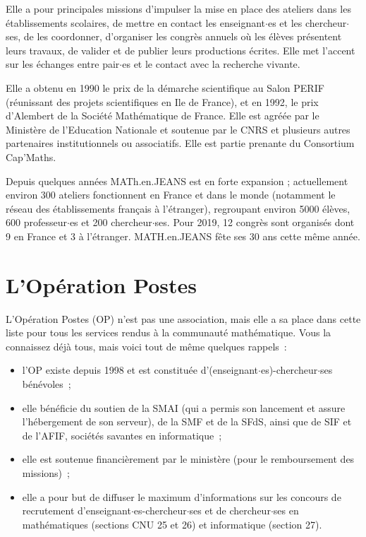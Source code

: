 Elle a pour principales missions d'impulser la mise en place des ateliers dans les \'etablissements scolaires, de mettre en contact les enseignant$\cdot$es et les chercheur$\cdot$ses, de les coordonner, d'organiser les congr\`es annuels o\`u les \'el\`eves pr\'esentent leurs travaux, de valider et de publier leurs productions \'ecrites. Elle met l'accent sur les \'echanges entre pair$\cdot$es et le contact avec la recherche vivante.

Elle a obtenu en 1990 le prix de la d\'emarche scientifique au Salon PERIF (r\'eunissant des projets scientifiques en Ile de France), et en 1992, le prix d'Alembert de la Soci\'et\'e Math\'ematique de France. Elle est agr\'e\'ee par le Minist\`ere de l'Education Nationale et soutenue par le CNRS et plusieurs autres partenaires institutionnels ou associatifs. Elle est partie prenante du Consortium Cap'Maths.

Depuis quelques ann\'ees MATh.en.JEANS est en forte expansion ; actuellement environ 300 ateliers fonctionnent en France et dans le monde (notamment le r\'eseau des \'etablissements fran\c{c}ais \`a l'\'etranger), regroupant environ 5000 \'el\`eves, 600 professeur$\cdot$es et 200 chercheur$\cdot$ses. Pour 2019, 12 congr\`es sont organis\'es dont 9 en France et 3 \`a l'\'etranger. MATH.en.JEANS f\^ete ses 30 ans cette m\^eme ann\'ee.


\section{L'Op\'eration Postes}

L'Op\'eration Postes (OP) n'est pas une association, mais elle a sa
place dans cette liste pour tous les services rendus \`a la
communaut\'e math\'ematique. Vous la connaissez d\'ej\`a tous,
mais voici tout de m\^eme quelques rappels~: 
\begin{itemize}
\item l'OP existe depuis 1998 et est constitu\'ee
d'(enseignant$\cdot$es)-chercheur$\cdot$ses b\'en\'evoles~;

\item elle b\'en\'eficie du soutien de la SMAI (qui a permis son
lancement et assure l'h\'ebergement de son serveur), de la SMF et de
la SFdS, ainsi que de SIF et de l'AFIF, soci\'et\'es savantes en
informatique~;

\item elle est soutenue financi\`erement par le minist\`ere (pour
le remboursement des missions)~;


\item elle a pour but de diffuser le maximum d'informations sur
les concours de recrutement d'enseignant$\cdot$es-chercheur$\cdot$ses et de
chercheur$\cdot$ses en math\'ematiques (sections CNU 25 et 26) et
informatique (section 27).
\end{itemize}

